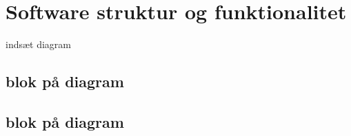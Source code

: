 \section{Software struktur og funktionalitet}
indsæt diagram



\subsection{blok på diagram}

\subsection{blok på diagram}